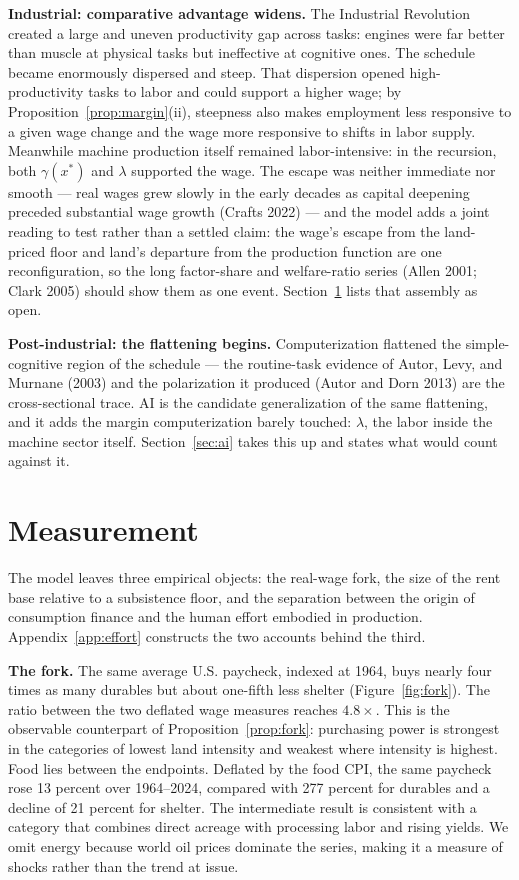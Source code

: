 \documentclass[12pt]{article}
\theoremstyle{plain}
\begin{document}
\textbf{Industrial: comparative advantage widens.} The Industrial Revolution created a large and uneven productivity gap across tasks: engines were far better than muscle at physical tasks but ineffective at cognitive ones. The schedule became enormously dispersed and steep. That dispersion opened high-productivity tasks to labor and could support a higher wage; by Proposition~\ref{prop:margin}(ii), steepness also makes employment less responsive to a given wage change and the wage more responsive to shifts in labor supply. Meanwhile machine production itself remained labor-intensive: in the recursion, both $\gamma (x^*)$ and $\lambda$ supported the wage. The escape was neither immediate nor smooth --- real wages grew slowly in the early decades as capital deepening preceded substantial wage growth (Crafts 2022) --- and the model adds a joint reading to test rather than a settled claim: the wage's escape from the land-priced floor and land's departure from the production function are one reconfiguration, so the long factor-share and welfare-ratio series (Allen 2001; Clark 2005) should show them as one event. Section~\ref{sec:measurement} lists that assembly as open.

\textbf{Post-industrial: the flattening begins.} Computerization flattened the simple-cognitive region of the schedule --- the routine-task evidence of Autor, Levy, and Murnane (2003) and the polarization it produced (Autor and Dorn 2013) are the cross-sectional trace. AI is the candidate generalization of the same flattening, and it adds the margin computerization barely touched: $\lambda$, the labor inside the machine sector itself. Section~\ref{sec:ai} takes this up and states what would count against it.

\section{Measurement}\label{sec:measurement}

The model leaves three empirical objects: the real-wage fork, the size of the rent base relative to a subsistence floor, and the separation between the origin of consumption finance and the human effort embodied in production. Appendix~\ref{app:effort} constructs the two accounts behind the third.

\textbf{The fork.} The same average U.S. paycheck, indexed at 1964, buys nearly four times as many durables but about one-fifth less shelter (Figure~\ref{fig:fork}). The ratio between the two deflated wage measures reaches $4.8\times$. This is the observable counterpart of Proposition~\ref{prop:fork}: purchasing power is strongest in the categories of lowest land intensity and weakest where intensity is highest. Food lies between the endpoints. Deflated by the food CPI, the same paycheck rose 13 percent over 1964--2024, compared with 277 percent for durables and a decline of 21 percent for shelter. The intermediate result is consistent with a category that combines direct acreage with processing labor and rising yields. We omit energy because world oil prices dominate the series, making it a measure of shocks rather than the trend at issue.
\end{document}
